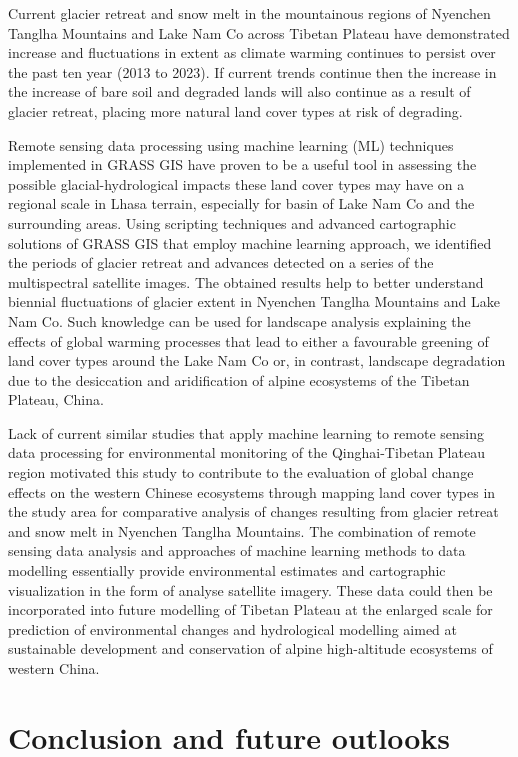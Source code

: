 \documentclass[final,5p,times,twocolumn]{elsarticle}
\begin{document}
Current glacier retreat and snow melt in the mountainous regions of Nyenchen Tanglha Mountains and Lake Nam Co across Tibetan Plateau have demonstrated increase and fluctuations in extent as climate warming continues to persist over the past ten year (2013 to 2023). If current trends continue then the increase in the increase of bare soil and degraded lands will also continue as a result of glacier retreat, placing more natural land cover types at risk of degrading. 

Remote sensing data processing using machine learning (ML) techniques implemented in GRASS GIS have proven to be a useful tool in assessing the possible glacial-hydrological impacts these land cover types may have on a regional scale in Lhasa terrain, especially for basin of Lake Nam Co and the surrounding areas. Using scripting techniques and advanced cartographic solutions of GRASS GIS that employ machine learning approach, we identified the periods of glacier retreat and advances detected on a series of the multispectral satellite images. The obtained results help to better understand biennial fluctuations of glacier extent in Nyenchen Tanglha Mountains and Lake Nam Co. Such knowledge can be used for landscape analysis explaining the effects of global warming processes that lead to either a favourable greening of land cover types around the Lake Nam Co or, in contrast, landscape degradation due to the desiccation and aridification of alpine ecosystems of the Tibetan Plateau, China.

Lack of current similar studies that apply machine learning to remote sensing data processing for environmental monitoring of the Qinghai-Tibetan Plateau region motivated this study to contribute to the evaluation of global change effects on the western Chinese ecosystems through mapping land cover types in the study area for comparative analysis of changes resulting from glacier retreat and snow melt in Nyenchen Tanglha Mountains. The combination of remote sensing data analysis and approaches of machine learning methods to data modelling essentially provide  environmental estimates and cartographic visualization in the form of analyse satellite imagery. These data could then be incorporated into future modelling of Tibetan Plateau at the enlarged scale for prediction of environmental changes and hydrological modelling aimed at sustainable development and conservation of alpine high-altitude ecosystems of western China. 

\section{Conclusion and future outlooks}
\end{document}
